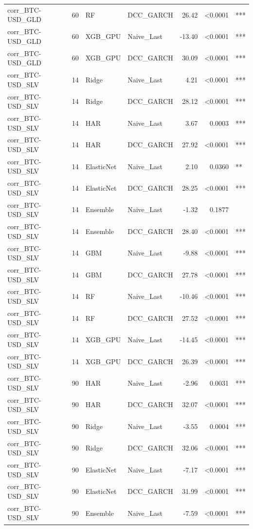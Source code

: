 \begin{table}[H]
\begin{tabular}{llllrrl}
corr_BTC-USD_GLD & 60 & RF & DCC_GARCH & 26.42 & <0.0001 & *** \\
corr_BTC-USD_GLD & 60 & XGB_GPU & Naive_Last & -13.40 & <0.0001 & *** \\
corr_BTC-USD_GLD & 60 & XGB_GPU & DCC_GARCH & 30.09 & <0.0001 & *** \\
corr_BTC-USD_SLV & 14 & Ridge & Naive_Last & 4.21 & <0.0001 & *** \\
corr_BTC-USD_SLV & 14 & Ridge & DCC_GARCH & 28.12 & <0.0001 & *** \\
corr_BTC-USD_SLV & 14 & HAR & Naive_Last & 3.67 & 0.0003 & *** \\
corr_BTC-USD_SLV & 14 & HAR & DCC_GARCH & 27.92 & <0.0001 & *** \\
corr_BTC-USD_SLV & 14 & ElasticNet & Naive_Last & 2.10 & 0.0360 & ** \\
corr_BTC-USD_SLV & 14 & ElasticNet & DCC_GARCH & 28.25 & <0.0001 & *** \\
corr_BTC-USD_SLV & 14 & Ensemble & Naive_Last & -1.32 & 0.1877 &  \\
corr_BTC-USD_SLV & 14 & Ensemble & DCC_GARCH & 28.40 & <0.0001 & *** \\
corr_BTC-USD_SLV & 14 & GBM & Naive_Last & -9.88 & <0.0001 & *** \\
corr_BTC-USD_SLV & 14 & GBM & DCC_GARCH & 27.78 & <0.0001 & *** \\
corr_BTC-USD_SLV & 14 & RF & Naive_Last & -10.46 & <0.0001 & *** \\
corr_BTC-USD_SLV & 14 & RF & DCC_GARCH & 27.52 & <0.0001 & *** \\
corr_BTC-USD_SLV & 14 & XGB_GPU & Naive_Last & -14.45 & <0.0001 & *** \\
corr_BTC-USD_SLV & 14 & XGB_GPU & DCC_GARCH & 26.39 & <0.0001 & *** \\
corr_BTC-USD_SLV & 90 & HAR & Naive_Last & -2.96 & 0.0031 & *** \\
corr_BTC-USD_SLV & 90 & HAR & DCC_GARCH & 32.07 & <0.0001 & *** \\
corr_BTC-USD_SLV & 90 & Ridge & Naive_Last & -3.55 & 0.0004 & *** \\
corr_BTC-USD_SLV & 90 & Ridge & DCC_GARCH & 32.06 & <0.0001 & *** \\
corr_BTC-USD_SLV & 90 & ElasticNet & Naive_Last & -7.17 & <0.0001 & *** \\
corr_BTC-USD_SLV & 90 & ElasticNet & DCC_GARCH & 31.99 & <0.0001 & *** \\
corr_BTC-USD_SLV & 90 & Ensemble & Naive_Last & -7.59 & <0.0001 & *** \\

\end{tabular}
\end{table}
